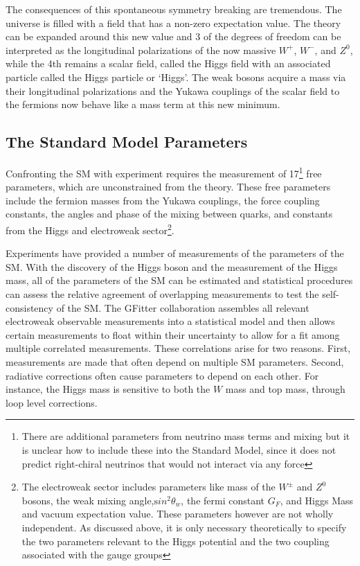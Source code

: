 The consequences of this spontaneous symmetry breaking are tremendous.
The universe is filled with a field that has a non-zero expectation value.
The theory can be expanded around this new value and 3 of the
degrees of freedom can be interpreted as the longitudinal polarizations of
the now massive $W^+$, $W^-$, and $Z^0$, while the 4th remains a scalar field, called
the Higgs field with an associated particle called the Higgs particle or `Higgs'.
The weak bosons acquire a mass via their longitudinal polarizations and the Yukawa
couplings of the scalar field to the fermions now behave like a mass term
at this new minimum. 


\subsection{The Standard Model Parameters}


Confronting the SM with experiment requires the measurement of
17\footnote{There are additional parameters from neutrino mass terms and
mixing but it is unclear how to include these into the Standard Model,
since it does not predict right-chiral neutrinos that would not interact via any force} free parameters, which
are unconstrained from the theory. These free parameters include the fermion
masses from the Yukawa couplings, the force coupling constants, the angles and phase of the mixing between
quarks, and constants from the Higgs and electroweak sector\footnote{ The electroweak sector includes
parameters like mass of the $W^{\pm}$ and $Z^0$ bosons, the weak mixing
angle,${\mathrm sin^2}\theta_w$, the fermi constant $G_F$, and Higgs
Mass and vacuum expectation value. These parameters however are not
wholly independent. As discussed above, it is only necessary
theoretically to specify the two parameters relevant to the Higgs
potential and the two coupling associated with the gauge groups }.

Experiments have provided a number of measurements of the
parameters of the SM\cite{lepew:2010vi}.  With the discovery of the Higgs boson and 
the measurement of the Higgs mass, all of the parameters
of the SM can be estimated and statistical procedures can assess
the relative agreement of overlapping measurements to test the self-consistency 
of the SM. The GFitter collaboration assembles
all relevant electroweak observable measurements into a statistical
model and then allows certain measurements to float within their
uncertainty to allow for a fit among multiple correlated measurements\cite{GFitter}. 
These correlations arise for two reasons. First, measurements are made that often
depend on multiple SM parameters. Second, radiative corrections often cause 
parameters to depend on each other. For instance, the Higgs mass is sensitive
to both the $W$ mass and top mass, through loop level corrections. 

